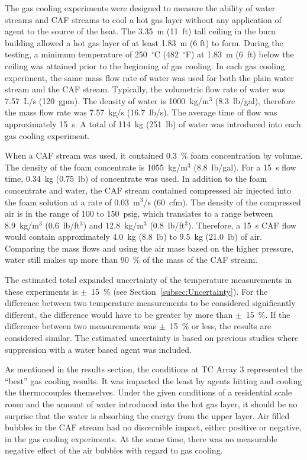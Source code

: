 \documentclass[12pt,oneside]{book}
\begin{document}
The gas cooling experiments were designed to measure the ability of water streams and CAF streams to cool a hot gas layer without any application of agent to the source of the heat. The 3.35~m (11~ft) tall ceiling in the burn building allowed a hot gas layer of at least 1.83~m (6 ft) to form. During the testing, a minimum temperature of 250~$^{\circ}$C (482~$^{\circ}$F) at 1.83~m (6~ft) below the ceiling was attained prior to the beginning of gas cooling. In each gas cooling experiment, the same mass flow rate of water was used for both the plain water stream and the CAF stream. Typically, the volumetric flow rate of water was 7.57~L/s (120~gpm). The density of water is 1000~kg/m$^3$ (8.3~lb/gal), therefore the mass flow rate was 7.57~kg/s (16.7~lb/s). The average time of flow was approximately 15~s. A total of 114~kg (251~lb) of water was introduced into each gas cooling experiment.

When a CAF stream was used, it contained 0.3~\% foam concentration by volume. The density of the foam concentrate is 1055~kg/m$^3$ (8.8~lb/gal). For a 15~s flow time, 0.34~kg (0.75~lb) of concentrate was used. In addition to the foam concentrate and water, the CAF stream contained compressed air injected into the foam solution at a rate of 0.03~m$^3$/s (60~cfm). The density of the compressed air is in the range of 100 to 150~psig, which translates to a range between 8.9~kg/m$^3$ (0.6~lb/ft$^3$) and 12.8~kg/m$^3$ (0.8~lb/ft$^3$). Therefore, a 15~s CAF flow would contain approximately 4.0~kg (8.8~lb) to 9.5~kg (21.0~lb) of air. Comparing the mass flows and using the air mass based on the higher pressure, water still makes up more than 90~\% of the mass of the CAF stream.

The estimated total expanded uncertainty of the temperature measurements in these experiments is $\pm$~15~\% (see Section~\ref{subsec:Uncertainty}). For the difference between two temperature measurements to be considered significantly different, the difference would have to be greater by more than $\pm$~15~\%. If the difference between two measurements was $\pm$~15~\% or less, the results are considered similar. The estimated uncertainty is based on previous studies where suppression with a water based agent was included.

As mentioned in the results section, the conditions at TC Array 3 represented the ``best'' gas cooling results. It was impacted the least by agents hitting and cooling the thermocouples themselves. Under the given conditions of a residential scale room and the amount of water introduced into the hot gas layer, it should be no surprise that the water is absorbing the energy from the upper layer. Air filled bubbles in the CAF stream had no discernible impact, either positive or negative, in the gas cooling experiments. At the same time, there was no measurable negative effect of the air bubbles with regard to gas cooling.
\end{document}
